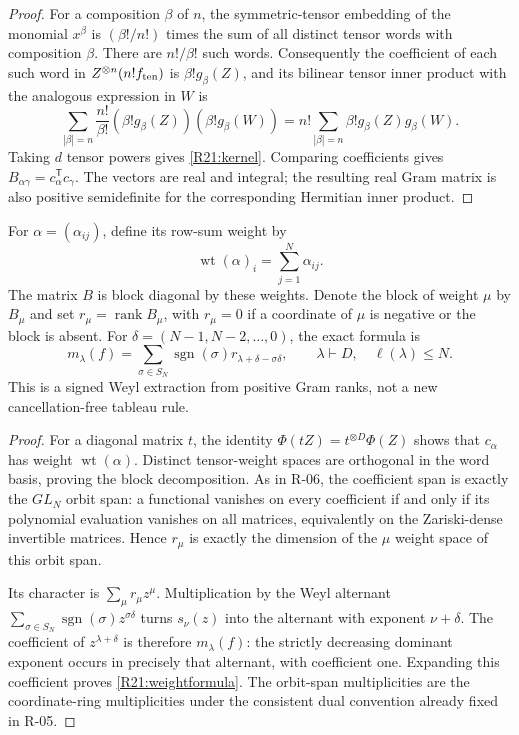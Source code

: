 \begin{proof}
For a composition $\beta$ of $n$, the symmetric-tensor embedding of
the monomial $x^\beta$ is
$(\beta!/n!)$ times the sum of all distinct tensor words with
composition $\beta$. There are $n!/\beta!$ such words.
Consequently the coefficient of each such word in
$Z^{\otimes n}(n!f_{\rm ten})$ is $\beta!g_\beta(Z)$, and its
bilinear tensor inner product with the analogous expression in $W$ is
\[
 \sum_{|\beta|=n}\frac{n!}{\beta!}
                 (\beta!g_\beta(Z))(\beta!g_\beta(W))
 =n!\sum_{|\beta|=n}\beta!g_\beta(Z)g_\beta(W).
\]
Taking $d$ tensor powers gives \eqref{R21:kernel}. Comparing coefficients
gives $B_{\alpha\gamma}=c_\alpha^{\mathsf T}c_\gamma$.
The vectors are real and integral; the resulting real Gram matrix is
also positive semidefinite for the corresponding Hermitian inner product.
\end{proof}

For $\alpha=(\alpha_{ij})$, define its row-sum weight by
\[
 \operatorname{wt}(\alpha)_i=\sum_{j=1}^N\alpha_{ij}.
\]
The matrix $B$ is block diagonal by these weights. Denote the block
of weight $\mu$ by $B_\mu$ and set $r_\mu=\operatorname{rank}B_\mu$,
with $r_\mu=0$ if a coordinate of $\mu$ is negative or the block is
absent. For $\delta=(N-1,N-2,\ldots,0)$, the exact formula is
\begin{equation}\label{R21:weightformula}
 m_\lambda(f)=
 \sum_{\sigma\in S_N}\operatorname{sgn}(\sigma)
              r_{\lambda+\delta-\sigma\delta},
 \qquad \lambda\vdash D,\quad\ell(\lambda)\leq N.
\end{equation}
This is a signed Weyl extraction from positive Gram ranks, not a new
cancellation-free tableau rule.

\begin{proof}
For a diagonal matrix $t$, the identity
$\Phi(tZ)=t^{\otimes D}\Phi(Z)$ shows that $c_\alpha$ has weight
$\operatorname{wt}(\alpha)$. Distinct tensor-weight spaces are
orthogonal in the word basis, proving the block decomposition.
As in R-06, the coefficient span is exactly the $GL_N$ orbit span:
a functional vanishes on every coefficient if and only if its
polynomial evaluation vanishes on all matrices, equivalently on the
Zariski-dense invertible matrices. Hence $r_\mu$ is exactly the
dimension of the $\mu$ weight space of this orbit span.

Its character is $\sum_\mu r_\mu z^\mu$.
Multiplication by the Weyl alternant
$\sum_{\sigma\in S_N}\operatorname{sgn}(\sigma)z^{\sigma\delta}$
turns $s_\nu(z)$ into the alternant with exponent $\nu+\delta$.
The coefficient of $z^{\lambda+\delta}$ is therefore $m_\lambda(f)$:
the strictly decreasing dominant exponent occurs in precisely that
alternant, with coefficient one. Expanding this coefficient proves
\eqref{R21:weightformula}. The orbit-span multiplicities are the
coordinate-ring multiplicities under the consistent dual convention
already fixed in R-05.
\end{proof}

